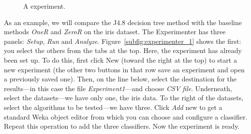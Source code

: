 \begin{figure}[!p]
\centering
{}
\newline
{}
\newline
{}
\caption{\label{fig:experimenter}A experiment.}
\end{figure}

As an example, we will compare the J4.8 decision tree method with the
baseline methods \textit{OneR} and \textit{ZeroR} on the iris
dataset. The Experimenter has three panels: \textit{Setup},
\textit{Run} and \textit{Analyze}. Figure~\ref{subfig:experimenter_1}
shows the first: you select the others from the tabs at the top. Here,
the experiment has already been set up. To do this, first click New
(toward the right at the top) to start a new experiment (the other two
buttons in that row save an experiment and open a previously saved
one). Then, on the line below, select the destination for the
results---in this case the file \textit{Experiment1}---and choose
\textit{CSV file}. Underneath, select the datasets---we have only one,
the iris data. To the right of the datasets, select the algorithms to
be tested---we have three. Click \textit{Add} new to get a standard
Weka object editor from which you can choose and configure a
classifier. Repeat this operation to add the three classifiers. Now
the experiment is ready.

